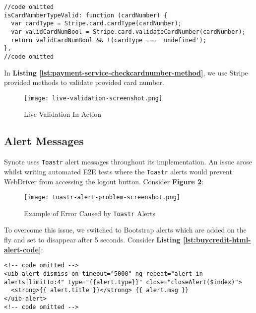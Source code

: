 \begin{listing}[H]
\begin{verbatim}
//code omitted
isCardNumberTypeValid: function (cardNumber) {
  var cardType = Stripe.card.cardType(cardNumber);
  var validCardNumBool = Stripe.card.validateCardNumber(cardNumber);
  return validCardNumBool && !(cardType === 'undefined');
},
//code omitted
\end{verbatim}
\label{lst:payment-service-checkcardnumber-method}
\end{listing}

In \textbf{Listing \ref{lst:payment-service-checkcardnumber-method}}, we use Stripe provided methods to validate provided card number.\\

\begin{figure}[!hbt]
  	\centering
 	\texttt{[image: live-validation-screenshot.png]}
  	\caption{Live Validation In Action}
 	\label{fig:live-validation-screenshot}
\end{figure}

\subsection{Alert Messages}
\label{subsec:alert-messages}

Synote uses \texttt{Toastr} alert messages throughout its implementation. An issue arose whilst writing automated E2E tests where the \texttt{Toastr} alerts would prevent WebDriver from accessing the logout button. Consider \textbf{Figure \ref{fig:toastr-alert-problem-screenshot}}:\\

\begin{figure}[!hbt]
  	\centering
 	\texttt{[image: toastr-alert-problem-screenshot.png]}
  	\caption{Example of Error Caused by \texttt{Toastr} Alerts}
 	\label{fig:toastr-alert-problem-screenshot}
\end{figure}

To overcome this issue, we switched to Bootstrap alerts which are added on the fly and set to disappear after 5 seconds. Consider \textbf{Listing \ref{lst:buycredit-html-alert-code}}:\\

\begin{listing}[H]
\begin{verbatim}
<!-- code omitted -->
<uib-alert dismiss-on-timeout="5000" ng-repeat="alert in alerts|limitTo:4" type="{{alert.type}}" close="closeAlert($index)">
  <strong>{{ alert.title }}</strong> {{ alert.msg }}
</uib-alert>
<!-- code omitted -->
\end{verbatim}
\label{lst:buycredit-html-alert-code}
\end{listing}

